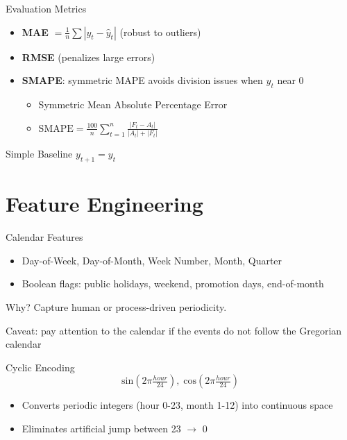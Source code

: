 \documentclass[11pt,compress,t,notes=noshow, xcolor=table]{beamer}
\begin{document}
\begin{vbframe}{Evaluation Metrics}
\vfill
  \begin{itemize}
    \item \textbf{MAE} $= \frac{1}{n}\sum |y_t-\hat y_t|$ (robust to outliers)
    \item \textbf{RMSE} (penalizes large errors)
    \item \textbf{SMAPE}: symmetric MAPE avoids division issues when $y_t$ near 0
    \begin{itemize}
        \item Symmetric Mean Absolute Percentage Error
        \item ${\text{SMAPE}}={\frac {100}{n}}\sum _{t=1}^{n}{\frac {|F_{t}-A_{t}|}{|A_{t}|+|F_{t}|}}$
    \end{itemize}
  \end{itemize}
\vfill
\end{vbframe}

\begin{vbframe}{Simple Baseline}
\large
\vfill
  $y_{t+1} = y_t$
\vfill
\end{vbframe}

\section{Feature Engineering}
\begin{vbframe}{Calendar Features}
  \vfill
  \begin{itemize}
    \item Day-of-Week, Day-of-Month, Week Number, Month, Quarter
    \item Boolean flags: public holidays, weekend, promotion days, end-of-month
  \end{itemize}
  \vspace{0.4cm}
  \begin{block}{Why?}
    Capture human or process-driven periodicity.
  \end{block}
  \vfill
  \pause
  Caveat: pay attention to the calendar if the events do not follow the Gregorian calendar
  \vfill
\end{vbframe}

\begin{vbframe}{Cyclic Encoding}
  \vfill
  \[\text{sin}(2\pi \tfrac{hour}{24}),\; \text{cos}(2\pi \tfrac{hour}{24})\]
  \vfill
  \begin{itemize}
    \item Converts periodic integers (hour 0-23, month 1-12) into continuous space
    \item Eliminates artificial jump between 23 \(\rightarrow\) 0
  \end{itemize}
  \vfill
\end{vbframe}
\end{document}
